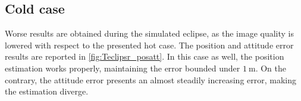 \subsection*{Cold case}
Worse results are obtained during the simulated eclipse, as the image quality is lowered with respect to the presented hot case. The position and attitude error results are reported in \cref{fig:Teclipsr_posatt}. In this case as well, the position estimation works properly, maintaining the error bounded under $\SI{1}{\meter}$. On the contrary, the attitude error presents an almost steadily increasing error, making the estimation diverge.\\

